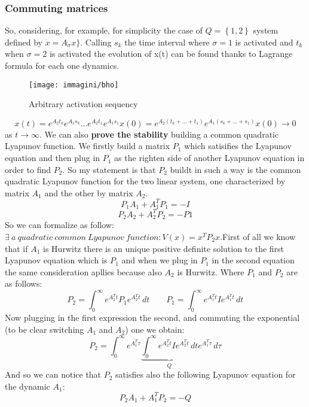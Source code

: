 \subsubsection{Commuting matrices}
So, considering, for example, for simplicity the case of $Q=\left\{1,2\right\}$ system defined by $\dot{x}=A_{\sigma}x\}$. Calling $s_k$ the time interval where $\sigma=1$ is activated and $t_k$ when $\sigma=2$ is activated the evolution of x(t) can be found thanks to Lagrange formula for each one dynamics.
\begin{figure}[H]
	\centering
	\texttt{[image: immagini/bho]}
	\caption{Arbitrary activation sequency}
	\label{fig:bho}
\end{figure}
\[
x(t)=e^{A_2t_k}e^{A_1s_k}\dots e^{A_2t_1}e^{A_1s_1}x(0)=e^{A_2(t_k+\dots +t_1)}e^{A_1(s_k+\dots +s_1)}x(0)\to 0
\] as $t\to\infty$.
We can also \textbf{prove the stability} building a common quadratic Lyapunov function. We firstly build a matrix $P_1$ which satisifies the Lyapunov equation and then plug in $P_1$ as the righten side of another Lyapunov equation in order to find $P_2$. So my statement is that $P_2$ buildt in such a way is the common quadratic Lyapunov function for the two linear system, one characterized by matrix $A_1$ and the other by matrix $A_2$.
\[
P_1A_1+A_1^TP_1=-I\]
\[
P_2A_2+A_2^TP_2=-P1
\]
So we can formalize as follow: $\exists\ a \ quadratic \ common \ Lyapunov \ function: V(x)=x^TP_2x$.First of all we know that if $A_1$ is Hurwitz there is an unique positive definite solution to the first Lyapunov equation which is $P_1$ and when we plug in $P_1$ in the second equation the same consideration apllies because also $A_2$ is Hurwitz. Where $P_1$ and $P_2$ are as follows:
\[P_2=\int_{0}^{\infty} e^{A_2^Tt}P_1e^{A_2^Tt}\, dt \qquad P_1=\int_{0}^{\infty} e^{A_1^Tt}Ie^{A_1^Tt}\, dt\]
Now plugging in the first expression the second, and commuting the exponential (to be clear switching $A_1$ and $A_2$) one we obtain: 
\[P_2=\int_{0}^{\infty} e^{A_1^T\tau}\underbrace{\int_{0}^{\infty} e^{A_2^Tt}Ie^{A_2^Tt}\, dt}_{Q}e^{A_1^T\tau}\, d\tau
\]
And so we can notice that $P_2$ satisfies also the following Lyapunov equation for the dynamic $A_1$:
\[
P_2A_1+A_1^TP_2=-Q
\]

